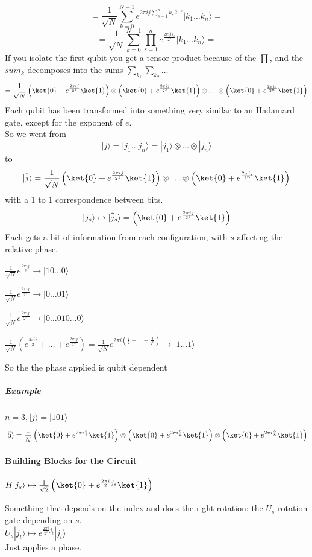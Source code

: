 \documentclass[10pt]{report}
\begin{document}
$$= \frac{1}{\sqrt{N}}\sum_{k=0}^{N-1}e^{2\pi ij\sum_{s=1}^n k_s2^{-s}}|k_1\ldots k_n\rangle =$$
$$=\frac{1}{\sqrt{N}}\sum_{k=0}^{N-1}\prod_{s=1}^n e^{\frac{2\pi ij k_s}{2^s}}|k_1\ldots k_n\rangle =$$
If you isolate the first qubit you get a tensor product because of the $\prod$, and the $sum_k$ decomposes into the sums $\sum_{k_1}\sum_{k_2}\ldots$
$$=\frac{1}{\sqrt{N}}\left(\ket{0}+e^{\frac{2\pi ij}{2^1}}\ket{1} \right)\otimes\left(\ket{0}+e^{\frac{2\pi ij}{2^2}}\ket{1} \right)\otimes \ldots\otimes \left(\ket{0}+e^{\frac{2\pi ij}{2^n}}\ket{1} \right)$$
Each qubit has been transformed into something very similar to an Hadamard gate, except for the exponent of $e$.\\
So we went from $$|j\rangle = |j_1\ldots j_n\rangle = |j_1\rangle\otimes\ldots\otimes|j_n\rangle$$ to $$|\tilde{j}\rangle=\frac{1}{\sqrt{N}}\left(\ket{0} + e^{\frac{2\pi ij}{2^1}}\ket{1}\right)\otimes\ldots\otimes\left(\ket{0} + e^{\frac{2\pi ij}{2^n}}\ket{1}\right)$$
with a 1 to 1 correspondence between bits.
$$|j_s\rangle\mapsto|\tilde{j}_s\rangle=\left(\ket{0} +e^{\frac{2\pi ij}{2^s}}\ket{1}\right)$$
Each gets a bit of information from each configuration, with $s$ affecting the relative phase.
\begin{list}{}{}
	\item $\frac{1}{\sqrt{N}} e^{\frac{2\pi i j}{2}} \rightarrow |10\ldots0\rangle$
	\item $\frac{1}{\sqrt{N}} e^{\frac{2\pi i j}{2^n}} \rightarrow |0\ldots01\rangle$
	\item $\frac{1}{\sqrt{N}} e^{\frac{2\pi i j}{2^s}} \rightarrow |0\ldots010\ldots0\rangle$
	\item $\frac{1}{\sqrt{N}} \left(e^{\frac{2\pi i j}{2}} +\ldots+e^{\frac{2\pi i j}{2^n}}\right) = \frac{1}{\sqrt{N}}e^{2\pi i(\frac{j}{2}+\ldots +\frac{j}{2^n})} \rightarrow |1\ldots1\rangle$
\end{list}
So the the phase applied is qubit dependent
\subparagraph{Example} $n=3, |j\rangle=|101\rangle$
$$|\tilde{5}\rangle = \frac{1}{N}\left(\ket{0} + e^{2\pi i\frac{5}{2}}\ket{1}\right)\otimes\left(\ket{0} + e^{2\pi i\frac{5}{4}}\ket{1}\right)\otimes\left(\ket{0} + e^{2\pi i\frac{5}{8}}\ket{1}\right)$$
\paragraph{Building Blocks for the Circuit}\begin{list}{}{}
	\item $H|j_s\rangle\mapsto\frac{1}{\sqrt{2}}\left(\ket{0}+e^{\frac{2\pi i}{2}j_s}\ket{1}\right)$
	\item Something that depends on the index and does the right rotation: the $U_s$ rotation gate depending on $s$.\\
	$U_s|j_t\rangle\mapsto e^{\frac{2\pi i }{2^s}j_t}|j_t\rangle$\\
	Just applies a phase.
	\item 
\end{list}
\end{document}
